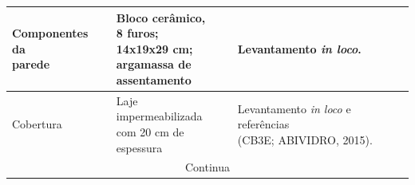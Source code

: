 \begin{table}[ht]
\begin{tabular*}{\columnwidth}{@{\extracolsep{\fill}}lll}
    \makecell[l]{Componentes da\\ parede}                          & \makecell[l]{Bloco cerâmico,\\ 8 furos; \\14x19x29 cm; \\argamassa de\\ assentamento} & Levantamento \textit{in loco}.                                                                                                                                         \\ \hline
    Cobertura                                                      & \makecell[l]{Laje impermeabilizada\\ com 20 cm de\\ espessura}                        & \makecell[l]{Levantamento \textit{in loco} e referências \\(CB3E; ABIVIDRO, 2015).}                                                                                    \\ \hline
    \multicolumn{3}{c}{Continua}\\\hline
    \end{tabular*}
\end{table}\pagebreak

